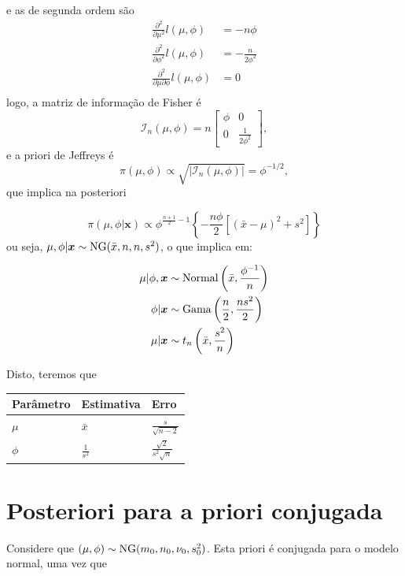\documentclass[
  letterpaper,
  DIV=11,
  numbers=noendperiod]{scrreprt}
\theoremstyle{definition}
\theoremstyle{definition}
\theoremstyle{plain}
\theoremstyle{remark}
\begin{document}
e as de segunda ordem são \[\begin{align}
\frac{\partial^2}{\partial \mu^2}l(\mu,\phi)&=-n\phi\\
\frac{\partial^2}{\partial \phi^2}l(\mu,\phi)&=-\frac{n}{2\phi^2}\\
\frac{\partial^2}{\partial \mu\partial \phi}l(\mu,\phi)&=0\\
\end{align}
\] logo, a matriz de informação de Fisher é
\[\mathcal{I}_n(\mu,\phi)=n\left[\begin{array}{cc}\phi & 0 \\0 & \frac{1}{2\phi^2}\end{array}\right],\]
e a priori de Jeffreys é
\[\pi(\mu,\phi)\propto \sqrt{|\mathcal{I}_n(\mu,\phi)|}=\phi^{-1/2},\]
que implica na posteriori

\[\pi(\mu,\phi|\boldsymbol{x})\propto \phi^{\frac{n+1}{2}-1}\left\{-\frac{n\phi}{2}\left[(\bar{x}-\mu)^2 +s^2 \right]\right\}\]
ou seja, \(\mu,\phi|\boldsymbol{x}\sim\hbox{NG}(\bar{x},n,n,s^2)\), o
que implica em:

\[\begin{align}
\mu|\phi,\boldsymbol{x}&\sim\hbox{Normal}\left(\bar{x},\frac{\phi^{-1}}{n}\right)\\
\phi|\boldsymbol{x}&\sim\hbox{Gama}\left(\frac{n}{2},\frac{ns^2}{2}\right)\\
\mu|\boldsymbol{x}&\sim t_{n}\left(\bar{x},\frac{s^2}{n}\right)
\end{align}\]

Disto, teremos que

\begin{longtable}[]{@{}lll@{}}
\toprule\noalign{}
Parâmetro & Estimativa & Erro \\
\midrule\noalign{}
\endhead
\bottomrule\noalign{}
\endlastfoot
\(\mu\) & \(\bar{x}\) & \(\frac{s}{\sqrt{n-2}}\) \\
\(\phi\) & \(\frac{1}{s^{2}}\) & \(\frac{\sqrt{2}}{s^2\sqrt{n}}\) \\
\end{longtable}

\section{Posteriori para a priori
conjugada}\label{posteriori-para-a-priori-conjugada}

Considere que \((\mu,\phi)\sim \hbox{NG}(m_0,n_0,\nu_0,s^2_0)\). Esta
priori é conjugada para o modelo normal, uma vez que
\end{document}
